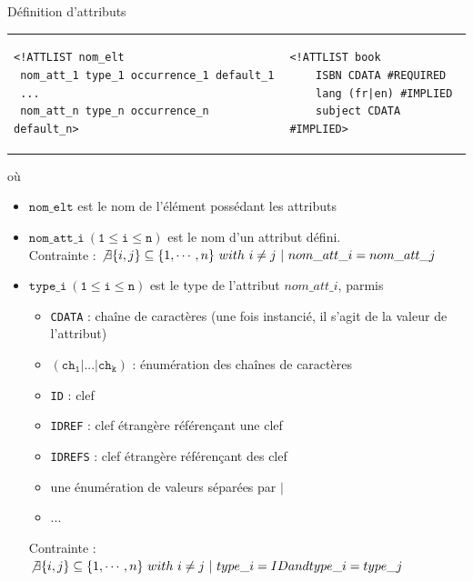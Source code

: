 \begin{frame}{Définition d'attributs}
\begin{tabular}{ll}
\begin{minipage}{0.55\textwidth}
\begin{small}
\begin{verbatim}
<!ATTLIST nom_elt
 nom_att_1 type_1 occurrence_1 default_1 
 ...
 nom_att_n type_n occurrence_n default_n> 
\end{verbatim}
\end{small}
\end{minipage}
&
\begin{minipage}{0.40\textwidth}
\begin{lstlisting}
<!ATTLIST book
    ISBN CDATA #REQUIRED 
    lang (fr|en) #IMPLIED
    subject CDATA #IMPLIED>
\end{lstlisting}
\end{minipage}\\
\end{tabular}
où\\
\begin{itemize}
\item $\mathtt{nom\_elt}$ est le nom de l'élément possédant les attributs 
\item $\mathtt{nom\_att\_i ~(1 \leq i \leq n)}$ est le nom d'un attribut défini. \\
  Contrainte : $\not \exists \{i,j\} \subseteq \{1,\cdots,n\} ~with~ i \neq j ~|~ nom\_att\_i  = nom\_att\_j$ 
\item $\mathtt{type\_i ~(1 \leq i \leq n)}$ est le type de l'attribut $nom\_att\_i$, parmis \\
  \begin{itemize}
  \item \texttt{CDATA} : cha\^ine de caractères (une fois instancié, il s'agit de la valeur de l'attribut)
  \item $\mathtt{(ch_1 | ... |ch_k)}$ : énumération des cha\^ines de caractères  
  \item \texttt{ID} : clef
  \item \texttt{IDREF} : clef étrangère référen\c{c}ant une clef
  \item \texttt{IDREFS} : clef étrangère référen\c{c}ant des clef 
  \item une énumération de valeurs séparées par $|$
  \item ...
  \end{itemize}
Contrainte : $\not \exists \{i,j\} \subseteq \{1,\cdots,n\} ~with~ i \neq j ~|~ type\_i  = ID and  type\_i  = type\_j $ 

\end{itemize}
\end{frame}
